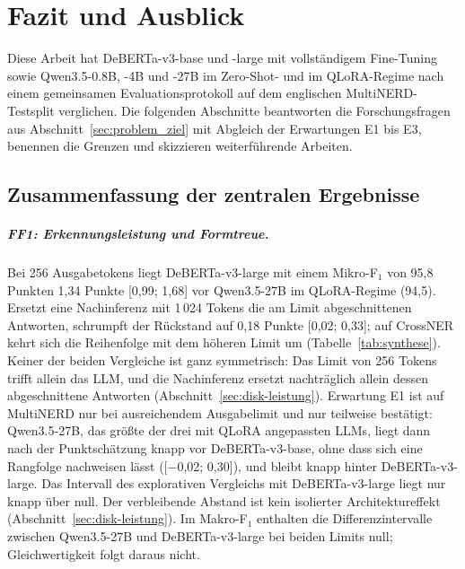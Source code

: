 %

\chapter{Fazit und Ausblick}
\label{chap:fazit}

Diese Arbeit hat DeBERTa-v3-base und -large mit vollständigem Fine-Tuning
sowie Qwen3.5-0.8B, -4B und -27B im Zero-Shot- und im QLoRA-Regime nach
einem gemeinsamen Evaluationsprotokoll auf dem englischen MultiNERD-Testsplit
verglichen.
Die folgenden Abschnitte beantworten die Forschungsfragen aus
Abschnitt~\ref{sec:problem_ziel} mit Abgleich der Erwartungen E1 bis E3,
benennen die Grenzen und skizzieren weiterführende Arbeiten.

\section{Zusammenfassung der zentralen Ergebnisse}
\label{sec:fazit-zusammenfassung}

\paragraph{FF1: Erkennungsleistung und Formtreue.}
Bei 256 Ausgabetokens liegt DeBERTa-v3-large mit einem Mikro-F$_1$ von
95,8 Punkten 1,34 Punkte [0,99; 1,68] vor Qwen3.5-27B im QLoRA-Regime
(94,5).
Ersetzt eine Nachinferenz mit 1\,024 Tokens die am Limit abgeschnittenen
Antworten, schrumpft der Rückstand auf 0,18 Punkte [0,02; 0,33];
auf CrossNER kehrt sich die Reihenfolge mit dem höheren Limit um
(Tabelle~\ref{tab:synthese}).
Keiner der beiden Vergleiche ist ganz symmetrisch: Das Limit von
256 Tokens trifft allein das LLM, und die Nachinferenz ersetzt
nachträglich allein dessen abgeschnittene Antworten
(Abschnitt~\ref{sec:disk-leistung}).
Erwartung E1 ist auf MultiNERD nur bei ausreichendem Ausgabelimit und
nur teilweise bestätigt: Qwen3.5-27B, das größte der drei mit QLoRA
angepassten LLMs, liegt dann nach der Punktschätzung
knapp vor DeBERTa-v3-base, ohne dass sich eine Rangfolge nachweisen
lässt ([$-$0,02; 0,30]), und bleibt knapp hinter DeBERTa-v3-large.
Das Intervall des explorativen Vergleichs mit DeBERTa-v3-large liegt nur
knapp über null.
Der verbleibende Abstand ist kein isolierter Architektureffekt
(Abschnitt~\ref{sec:disk-leistung}).
Im Makro-F$_1$ enthalten die Differenzintervalle zwischen Qwen3.5-27B und
DeBERTa-v3-large bei beiden Limits null; Gleichwertigkeit folgt
daraus nicht.

